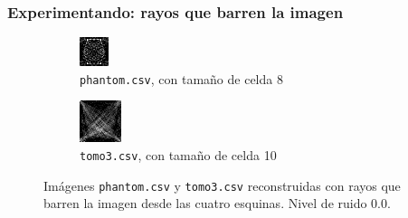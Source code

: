 \documentclass{beamer}
\begin{document}
\begin{frame}
\frametitle{Experimentando: rayos que barren la imagen}

\begin{figure}
\centering
\begin{subfigure}{0.5\textwidth}
  \centering
  \includegraphics[width=0.6\linewidth]{rayos/phantom-barrido}
  \caption{\texttt{phantom.csv}, con tamaño de celda 8}
\end{subfigure}%
\begin{subfigure}{0.5\textwidth}
  \centering
  \includegraphics[width=0.6\linewidth]{rayos/tomo3-barrido}
  \caption{\texttt{tomo3.csv}, con tamaño de celda 10}
\end{subfigure}
\caption{Imágenes \texttt{phantom.csv} y \texttt{tomo3.csv} reconstruidas con rayos que barren la imagen desde las cuatro esquinas. Nivel de 
ruido 0.0.}
\label{fig:muestras_barrido}
\end{figure}

\end{frame}
\end{document}
